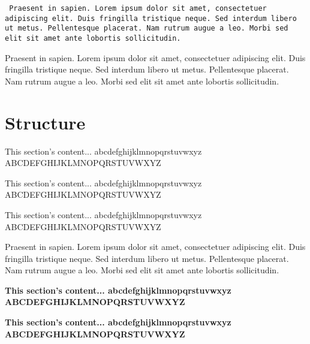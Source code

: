 \texttt{
Praesent in sapien. Lorem ipsum dolor sit amet, consectetuer adipiscing elit.
Duis fringilla tristique neque. Sed interdum libero ut metus. Pellentesque placerat.
Nam rutrum augue a leo. Morbi sed elit sit amet ante lobortis sollicitudin.
}

Praesent in sapien. Lorem ipsum dolor sit amet, consectetuer adipiscing elit.
Duis fringilla tristique neque. Sed interdum libero ut metus. Pellentesque placerat.
Nam rutrum augue a leo. Morbi sed elit sit amet ante lobortis sollicitudin.

\clearpage %

\section*{Structure}
\small{This section's content...\newline
abcdefghijklmnopqrstuvwxyz\newline
ABCDEFGHIJKLMNOPQRSTUVWXYZ}

\tiny{This section's content...\newline
abcdefghijklmnopqrstuvwxyz\newline
ABCDEFGHIJKLMNOPQRSTUVWXYZ}

\normalsize{This section's content...\newline
abcdefghijklmnopqrstuvwxyz\newline
ABCDEFGHIJKLMNOPQRSTUVWXYZ}

Praesent in sapien. Lorem ipsum dolor sit amet, consectetuer adipiscing elit.
Duis fringilla tristique neque. Sed interdum libero ut metus. Pellentesque placerat.
Nam rutrum augue a leo. Morbi sed elit sit amet ante lobortis sollicitudin.

\textbf{
\small{This section's content...\newline
abcdefghijklmnopqrstuvwxyz\newline
ABCDEFGHIJKLMNOPQRSTUVWXYZ}}

\textbf{
\tiny{This section's content...\newline
abcdefghijklmnopqrstuvwxyz\newline
ABCDEFGHIJKLMNOPQRSTUVWXYZ}}

